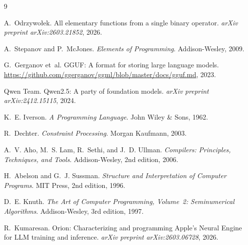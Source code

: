 \documentclass[acmsmall,nonacm]{acmart}
\begin{document}

\begin{thebibliography}{9}

A.~Odrzywołek.
\newblock All elementary functions from a single binary operator.
\newblock \emph{arXiv preprint arXiv:2603.21852}, 2026.

A.~Stepanov and P.~McJones.
\newblock \emph{Elements of Programming}.
\newblock Addison-Wesley, 2009.

G.~Gerganov et~al.
\newblock GGUF: A format for storing large language models.
\newblock \url{https://github.com/ggerganov/ggml/blob/master/docs/gguf.md}, 2023.

Qwen Team.
\newblock Qwen2.5: A party of foundation models.
\newblock \emph{arXiv preprint arXiv:2412.15115}, 2024.

K.~E. Iverson.
\newblock \emph{A Programming Language}.
\newblock John Wiley \& Sons, 1962.

R.~Dechter.
\newblock \emph{Constraint Processing}.
\newblock Morgan Kaufmann, 2003.

A.~V. Aho, M.~S. Lam, R.~Sethi, and J.~D. Ullman.
\newblock \emph{Compilers: Principles, Techniques, and Tools}.
\newblock Addison-Wesley, 2nd edition, 2006.

H.~Abelson and G.~J. Sussman.
\newblock \emph{Structure and Interpretation of Computer Programs}.
\newblock MIT Press, 2nd edition, 1996.

D.~E. Knuth.
\newblock \emph{The Art of Computer Programming, Volume~2:
  Seminumerical Algorithms}.
\newblock Addison-Wesley, 3rd edition, 1997.

R.~Kumaresan.
\newblock Orion: Characterizing and programming Apple's Neural Engine
  for LLM training and inference.
\newblock \emph{arXiv preprint arXiv:2603.06728}, 2026.

\end{thebibliography}
\end{document}
